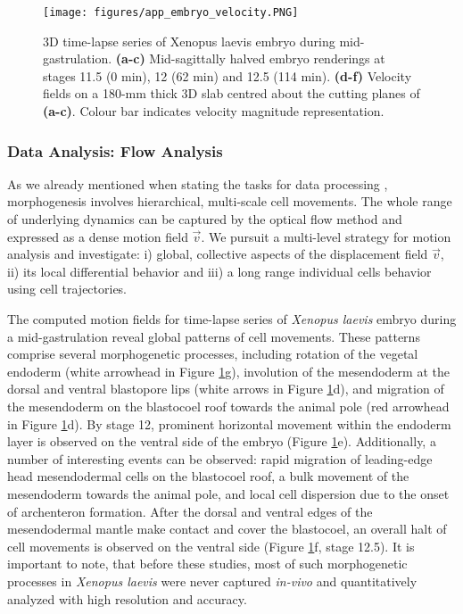 \begin{figure}[ht]
  \centerline{
    \texttt{[image: figures/app\_embryo\_velocity.PNG]} 
  }  
  \caption{3D time-lapse series of Xenopus laevis embryo during mid-gastrulation.
\textbf{(a-c)} Mid-sagittally  halved embryo renderings at stages 11.5 (0 min), 12 (62 min) and 12.5 (114 min). \textbf{(d-f)} Velocity fields on a 180-mm thick 3D slab centred about the cutting planes of \textbf{(a-c)}. Colour bar indicates velocity magnitude representation.}
  \label{fig:app_embryo_velocity}
\end{figure}

\subsubsection{Data Analysis: Flow Analysis}

As  we already mentioned when stating the tasks for data processing , morphogenesis involves hierarchical, multi-scale cell movements. The whole range of underlying dynamics can be captured by the optical flow method and expressed as a dense motion field $\overrightarrow{v}$. We pursuit a multi-level strategy for motion analysis and investigate: i) global, collective aspects of the displacement field $\overrightarrow{v}$, ii) its local differential behavior and iii) a long range individual cells behavior using cell trajectories.

The computed motion fields for time-lapse series of \textit{Xenopus laevis} embryo during a mid-gastrulation  reveal global patterns of cell movements. These patterns comprise several morphogenetic processes, including rotation of the vegetal endoderm
(white arrowhead in Figure \ref{fig:app_embryo_velocity}g), involution of
the mesendoderm at the dorsal and ventral blastopore lips (white
arrows in Figure \ref{fig:app_embryo_velocity}d), and migration of the mesendoderm on the blastocoel roof towards the animal pole (red arrowhead in Figure  \ref{fig:app_embryo_velocity}d). By stage 12, prominent horizontal
movement within the endoderm layer is observed on the ventral side of the embryo (Figure \ref{fig:app_embryo_velocity}e). Additionally, a number of interesting events can be observed:  rapid migration of leading-edge head mesendodermal cells on the blastocoel roof, a bulk movement of the mesendoderm towards the animal pole, and local
cell dispersion due to the onset of archenteron formation. After the dorsal
and ventral edges of the mesendodermal mantle make contact and
cover the blastocoel, an overall halt of cell movements is observed on
the ventral side (Figure \ref{fig:app_embryo_velocity}f, stage 12.5). 
It is important to note, that before these studies, most of such morphogenetic processes in \textit{Xenopus laevis} were never captured \textit{in-vivo} and quantitatively analyzed with high resolution and accuracy.




